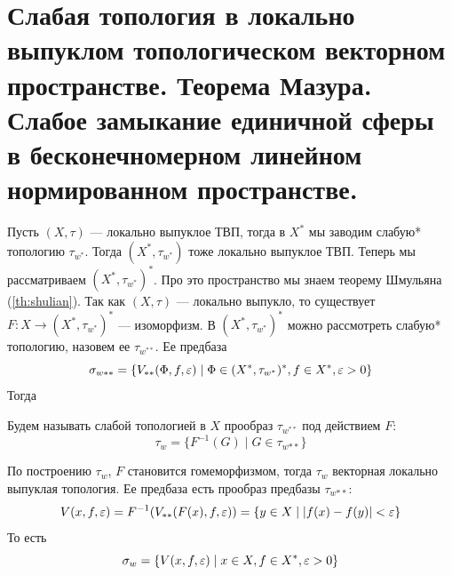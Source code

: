 \newpage
\section{Слабая топология в локально выпуклом топологическом векторном пространстве. Теорема Мазура. Слабое замыкание единичной сферы в бесконечномерном линейном нормированном пространстве.}
Пусть $(X, \tau)$ --- локально выпуклое ТВП, тогда в $X^*$ мы заводим слабую* топологию $\tau_{w^*}$. Тогда $(X^*, \tau_{w^*})$ тоже локально выпуклое ТВП. Теперь мы рассматриваем $(X^*, \tau_{w^*})^*$. Про это пространство мы знаем теорему Шмульяна (\ref{th:shulian}). Так как $(X, \tau)$ --- локально выпукло, то существует $F: X \to (X^*, \tau_{w^*})^*$ --- изоморфизм. В $(X^*, \tau_{w^*})^*$ можно рассмотреть слабую* топологию, назовем ее $\tau_{w^{**}}$. Ее предбаза 
$$
\sigma_{w**} = \{V_{**}(\Phi, f , \varepsilon) \mid \Phi \in (X^*, \tau_{w^*})^*, f \in X^*, \varepsilon > 0\}
$$
Тогда 
\begin{definition}
	Будем называть слабой топологией в $X$ прообраз $\tau_{w^{**}}$ под действием $F$:
	$$
	\tau_w = \{F^{-1}(G)  \mid G \in \tau_{w{**}}\}
	$$
\end{definition}
По построению $\tau_w$, $F$ становится гомеморфизмом, тогда $\tau_w$ векторная локально выпуклая топология. Ее предбаза есть прообраз предбазы $\tau_{w{**}}$:
$$
V(x,f,\varepsilon) = F^{-1}(V_{**}(F(x), f, \varepsilon)) = \{y \in X \mid |f(x) - f(y)| < \varepsilon \}
$$
То есть 
$$
\sigma_w = \{V(x, f, \varepsilon) \mid x \in X, f \in X^*, \varepsilon > 0\}
$$

